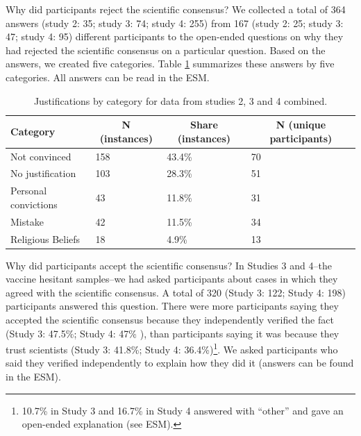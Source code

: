 \documentclass[
  doc,floatsintext]{apa6}
\begin{document}
Why did participants reject the scientific consensus? We collected a total of 364 answers (study 2: 35; study 3: 74; study 4: 255) from 167 (study 2: 25; study 3: 47; study 4: 95) different participants to the open-ended questions on why they had rejected the scientific consensus on a particular question. Based on the answers, we created five categories. Table \ref{tab:justifications} summarizes these answers by five categories. All answers can be read in the ESM.

\begin{table}[tbp]

\begin{center}
\begin{threeparttable}

\caption{\label{tab:justifications}Justifications by category for data from studies 2, 3 and 4 combined.}

\begin{tabular}{llll}
\toprule
Category & \multicolumn{1}{c}{N (instances)} & \multicolumn{1}{c}{Share (instances)} & \multicolumn{1}{c}{N (unique participants)}\\
\midrule
Not convinced & 158 & 43.4\% & 70\\
No justification & 103 & 28.3\% & 51\\
Personal convictions & 43 & 11.8\% & 31\\
Mistake & 42 & 11.5\% & 34\\
Religious Beliefs & 18 & 4.9\% & 13\\
\bottomrule
\end{tabular}

\end{threeparttable}
\end{center}

\end{table}

Why did participants accept the scientific consensus? In Studies 3 and 4--the vaccine hesitant samples--we had asked participants about cases in which they agreed with the scientific consensus. A total of 320 (Study 3: 122; Study 4: 198) participants answered this question. There were more participants saying they accepted the scientific consensus because they independently verified the fact (Study 3: 47.5\%; Study 4: 47\% ), than participants saying it was because they trust scientists (Study 3: 41.8\%; Study 4: 36.4\%)\footnote{10.7\% in Study 3 and 16.7\% in Study 4 answered with ``other'' and gave an open-ended explanation (see ESM).}. We asked participants who said they verified independently to explain how they did it (answers can be found in the ESM).
\end{document}
